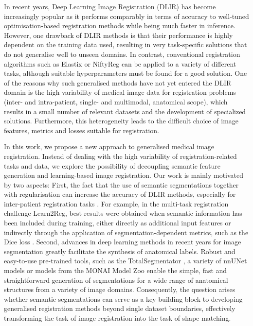 In recent years, Deep Learning Image Registration (DLIR) has become increasingly popular as it performs comparably in terms of accuracy to well-tuned optimisation-based registration methods while being much faster in inference. However, one drawback of DLIR methods is that their performance is highly dependent on the training data used, resulting in very task-specific solutions that do not generalise well to unseen domains. In contrast, conventional registration algorithms such as Elastix \citep{klein2010Elastix} or NiftyReg \citep{Modat2010Nifty} can be applied to a variety of different tasks, although suitable hyperparameters must be found for a good solution.
One of the reasons why such generalised methods have not yet entered the DLIR domain is the high variability of medical image data for registration problems (inter- and intra-patient, single- and multimodal, anatomical scope), which results in a small number of relevant datasets and the development of specialized solutions. Furthermore, this heterogeneity leads to the difficult choice of image features, metrics and losses suitable for registration. 

In this work, we propose a new approach to generalised medical image registration. Instead of dealing with the high variability of registration-related tasks and data, we explore the possibility of decoupling semantic feature generation and learning-based image registration. Our work is mainly motivated by two aspects: First, the fact that the use of semantic segmentations together with regularisation can increase the accuracy of DLIR methods, especially for inter-patient registration tasks \citep{L2R}. For example, in the multi-task registration challenge Learn2Reg, best results were obtained when semantic information has been included during training, either directly as additional input features or indirectly through the application of segmentation-dependent metrics, such as the Dice loss \citep{L2R}. Second, advances in deep learning methods in recent years for image segmentation greatly facilitate the synthesis of anatomical labels. Robust and easy-to-use pre-trained tools, such as the TotalSegmentator \citep{TotalSeg}, a variety of nnUNet \citep{nnUnet} models or models from the MONAI Model Zoo \citep{Cardoso2022MONAI} enable the simple, fast and straightforward generation of segmentations for a wide range of anatomical structures from a variety of image domains.
Consequently, the question arises whether semantic segmentations can serve as a key building block to developing generalised registration methods beyond single dataset boundaries, effectively transforming the task of image registration into the task of shape matching. 

